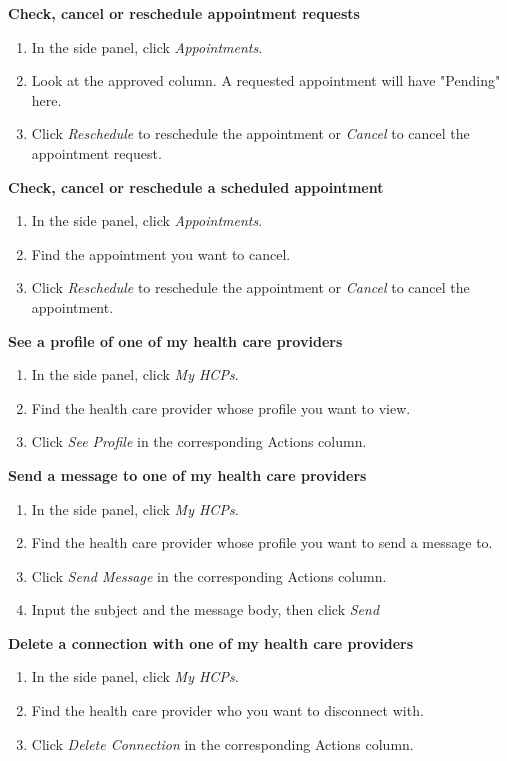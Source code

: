 \documentclass[12pt]{report}
\begin{document}
\textbf{Check, cancel or reschedule appointment requests}
\begin{enumerate}
\item In the side panel, click \textit{ Appointments}.
\item Look at the approved column. A requested appointment will have "Pending" here.
\item Click \textit{Reschedule} to reschedule the appointment or \textit{Cancel} to cancel the appointment request.
\end{enumerate}
\textbf{Check, cancel or reschedule a scheduled appointment}
\begin{enumerate}
\item In the side panel, click \textit{Appointments}.
\item Find the appointment you want to cancel. 
\item Click \textit{Reschedule} to reschedule the appointment or \textit{Cancel} to cancel the appointment.
\end{enumerate}
\textbf{See a profile of one of my health care providers}
\begin{enumerate}
\item In the side panel, click \textit{My HCPs}.
\item Find the health care provider whose profile you want to view.
\item Click \textit{See Profile} in the corresponding Actions column.
\end{enumerate}
\textbf{Send a message to one of my health care providers}
\begin{enumerate}
\item In the side panel, click \textit{My HCPs}.
\item Find the health care provider whose profile you want to send a message to.
\item Click \textit{Send Message} in the corresponding Actions column.
\item Input the subject and the message body, then click \textit{Send}
\end{enumerate}
\textbf{Delete a connection with one of my health care providers}
\begin{enumerate}
\item In the side panel, click \textit{My HCPs}.
\item Find the health care provider who you want to disconnect with.
\item Click \textit{Delete Connection} in the corresponding Actions column.
\end{enumerate}
\end{document}
